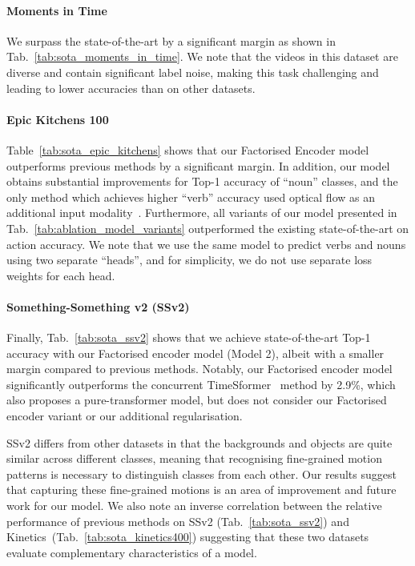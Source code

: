 \vspace{-0\baselineskip}
\paragraph{Moments in Time}
We surpass the state-of-the-art by a significant margin as shown in Tab.~\ref{tab:sota_moments_in_time}. 
We note that the videos in this dataset are diverse and contain significant label  noise, making this task challenging and leading to lower accuracies than on other datasets.

\vspace{-0\baselineskip}
\paragraph{Epic Kitchens 100}
Table~\ref{tab:sota_epic_kitchens} shows that our Factorised Encoder model outperforms previous methods by a significant margin. In addition, our model obtains substantial improvements for Top-1 accuracy of ``noun'' classes, and the only method which achieves higher ``verb'' accuracy used optical flow as an additional input modality~\cite{lin_tsm_cvpr_2019, price_arxiv_2019}. 
Furthermore, all variants of our model presented in Tab.~\ref{tab:ablation_model_variants} outperformed the existing state-of-the-art on  action accuracy.
We note that we use the same model to predict verbs and nouns using two separate ``heads'', and for simplicity, we do not use separate loss weights for each head. 

\paragraph{Something-Something v2 (SSv2)}

Finally, Tab.~\ref{tab:sota_ssv2} shows that we achieve state-of-the-art Top-1 accuracy with our Factorised encoder model (Model 2), albeit with a smaller margin compared to previous methods.
Notably, our Factorised encoder model significantly outperforms the concurrent TimeSformer~\cite{bertasius_arxiv_2021} method by 2.9\%, which also proposes a pure-transformer model, but does not consider our Factorised encoder variant or our additional regularisation.

SSv2 differs from other datasets in that the backgrounds and objects are quite similar across different classes, meaning that recognising fine-grained motion patterns is necessary to distinguish classes from each other.
Our results suggest that capturing these fine-grained motions is an area of improvement and future work for our model.
We also note an inverse correlation between the relative performance of previous methods on SSv2 (Tab.~\ref{tab:sota_ssv2}) and Kinetics~(Tab.~\ref{tab:sota_kinetics400})
suggesting that these two datasets evaluate complementary characteristics of a model.

